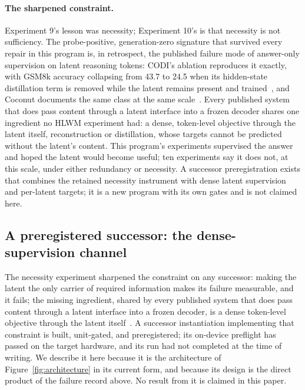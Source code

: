 \documentclass[10pt,a4paper]{article}
\begin{document}
\paragraph{The sharpened constraint.}
Experiment 9's lesson was necessity; Experiment 10's is that necessity is not
sufficiency. The probe-positive, generation-zero signature that survived
every repair in this program is, in retrospect, the published failure mode
of answer-only supervision on latent reasoning tokens: CODI's ablation
reproduces it exactly, with GSM8k accuracy collapsing from 43.7 to 24.5 when
its hidden-state distillation term is removed while the latent remains
present and trained~\cite{codi2025}, and Coconut documents the same class at
the same scale~\cite{coconut2024}. Every published system that does pass
content through a latent interface into a frozen decoder shares one
ingredient no HLWM experiment had: a dense, token-level objective through the
latent itself, reconstruction or distillation, whose targets cannot be
predicted without the latent's content. This program's experiments supervised
the answer and hoped the latent would become useful; ten experiments say it does
not, at this scale, under either redundancy or necessity. A successor
preregistration exists that combines the retained necessity instrument with
dense latent supervision and per-latent targets; it is a new program with
its own gates and is not claimed here.

\subsection{A preregistered successor: the dense-supervision channel}
\label{sec:successor}

The necessity experiment sharpened the constraint on any successor: making
the latent the only carrier of required information makes its failure
measurable, and it fails; the missing ingredient, shared by every published
system that does pass content through a latent interface into a frozen
decoder, is a dense token-level objective through the latent
itself~\cite{codi2025,coconut2024}. A successor instantiation implementing
that constraint is built, unit-gated, and preregistered; its on-device
preflight has passed on the target hardware, and its run had not completed
at the time of writing. We describe it here because it is the architecture
of Figure~\ref{fig:architecture} in its current form, and because its
design is the direct product of the failure record above. No result from it
is claimed in this paper.
\end{document}
